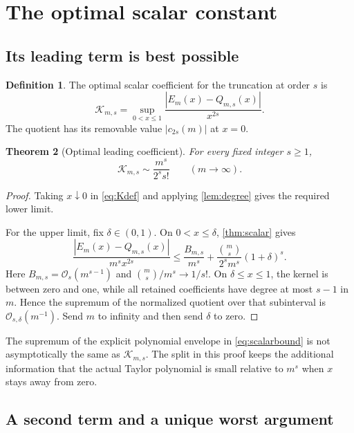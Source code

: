 \documentclass[11pt,a4paper]{article}
\newtheorem{theorem}{Theorem}[section]
\theoremstyle{definition}
\newtheorem{definition}[theorem]{Definition}
\newcommand{\bigO}{\mathcal O}
\newcommand{\Kopt}{\mathcal K}
\begin{document}
\section{The optimal scalar constant}\label{sec:optimal}

\subsection{Its leading term is best possible}

\begin{definition}
The optimal scalar coefficient for the truncation at order $s$ is
\begin{equation}\label{eq:Kdef}
 \Kopt_{m,s}=\sup_{0<x\le1}
      \frac{|E_m(x)-Q_{m,s}(x)|}{x^{2s}}.
\end{equation}
The quotient has its removable value $|c_{2s}(m)|$ at $x=0$.
\end{definition}

\begin{theorem}[Optimal leading coefficient]\label{thm:optimalfirst}
For every fixed integer $s\ge1$,
\begin{equation}\label{eq:Kleading}
 \Kopt_{m,s}\sim\frac{m^s}{2^s s!}\qquad(m\longrightarrow\infty).
\end{equation}
\end{theorem}
\begin{proof}
Taking $x\downarrow0$ in \eqref{eq:Kdef} and applying
\cref{lem:degree} gives the required lower limit.

For the upper limit, fix $\delta\in(0,1)$. On $0<x\le\delta$,
\cref{thm:scalar} gives
\[
 \frac{|E_m(x)-Q_{m,s}(x)|}{m^s x^{2s}}
 \le\frac{B_{m,s}}{m^s}
    +\frac{\binom ms}{2^s m^s}(1+\delta)^s.
\]
Here $B_{m,s}=\bigO_s(m^{s-1})$ and
$\binom ms/m^s\to1/s!$. On $\delta\le x\le1$, the kernel is
between zero and one, while all retained coefficients have degree at most
$s-1$ in $m$. Hence the supremum of the normalized quotient over that
subinterval is $\bigO_{s,\delta}(m^{-1})$. Send $m$ to infinity and
then send $\delta$ to zero.
\end{proof}

The supremum of the explicit polynomial envelope in
\eqref{eq:scalarbound} is not asymptotically the same as
$\Kopt_{m,s}$. The split in this proof keeps the additional information
that the actual Taylor polynomial is small relative to $m^s$ when $x$
stays away from zero.

\subsection{A second term and a unique worst argument}
\end{document}
